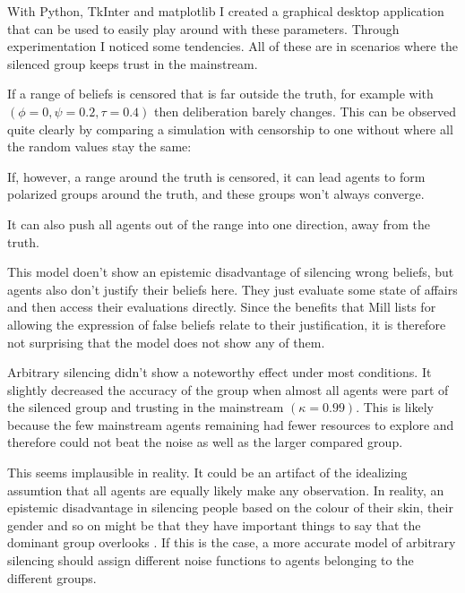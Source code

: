 \documentclass{essay-formal}
\begin{document}
With Python, TkInter and matplotlib I created a graphical desktop application that can be used to easily play around with these parameters. Through experimentation I noticed some tendencies. All of these are in scenarios where the silenced group keeps trust in the mainstream. 

If a range of beliefs is censored that is far outside the truth, for example with $(\phi = 0, \psi = 0.2, \tau = 0.4)$ then deliberation barely changes. This can be observed quite clearly by comparing a simulation with censorship to one without where all the random values stay the same:


If, however, a range around the truth is censored, it can lead agents to form polarized groups around the truth, and these groups won't always converge.


It can also push all agents out of the range into one direction, away from the truth.


This model doen't show an epistemic disadvantage of silencing wrong beliefs, but agents also don't justify their beliefs here. They just evaluate some state of affairs and then access their evaluations directly. Since the benefits that Mill lists for allowing the expression of false beliefs relate to their justification, it is therefore not surprising that the model does not show any of them.

Arbitrary silencing didn't show a noteworthy effect under most conditions. It slightly decreased the accuracy of the group when almost all agents were part of the silenced group and trusting in the mainstream $(\kappa=0.99)$. This is likely because the few mainstream agents remaining had fewer resources to explore and therefore could not beat the noise as well as the larger compared group.


This seems implausible in reality. It could be an artifact of the idealizing assumtion that all agents are equally likely make any observation. In reality, an epistemic disadvantage in silencing people based on the colour of their skin, their gender and so on might be that they have important things to say that the dominant group overlooks \parencite[This idea is developed in the literature on standpoint epistemology. See][]{harding1992;...}. If this is the case, a more accurate model of arbitrary silencing should assign different noise functions to agents belonging to the different groups.
\end{document}
